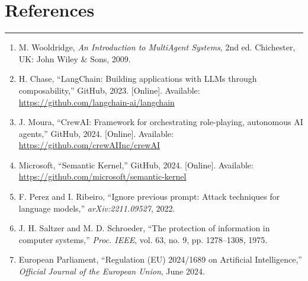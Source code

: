 \chapter{References}

\noindent\rule{\linewidth}{2pt}

\vspace{0.5cm}

\begin{enumerate}

\item M. Wooldridge, \textit{An Introduction to MultiAgent Systems}, 2nd ed. Chichester, UK: John Wiley \& Sons, 2009.

\vspace{0.3cm}

\item H. Chase, ``LangChain: Building applications with LLMs through composability,'' GitHub, 2023. [Online]. Available: \url{https://github.com/langchain-ai/langchain}

\vspace{0.3cm}

\item J. Moura, ``CrewAI: Framework for orchestrating role-playing, autonomous AI agents,'' GitHub, 2024. [Online]. Available: \url{https://github.com/crewAIInc/crewAI}

\vspace{0.3cm}

\item Microsoft, ``Semantic Kernel,'' GitHub, 2024. [Online]. Available: \url{https://github.com/microsoft/semantic-kernel}

\vspace{0.3cm}

\item F. Perez and I. Ribeiro, ``Ignore previous prompt: Attack techniques for language models,'' \textit{arXiv:2211.09527}, 2022.

\vspace{0.3cm}

\item J. H. Saltzer and M. D. Schroeder, ``The protection of information in computer systems,'' \textit{Proc. IEEE}, vol. 63, no. 9, pp. 1278--1308, 1975.

\vspace{0.3cm}

\item European Parliament, ``Regulation (EU) 2024/1689 on Artificial Intelligence,'' \textit{Official Journal of the European Union}, June 2024.


\end{enumerate}
